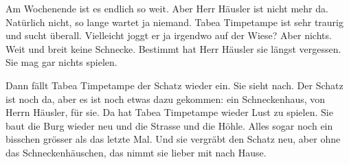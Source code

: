 Am Wochenende ist es endlich so weit. Aber Herr Häusler ist nicht mehr da. Natürlich nicht, so lange wartet ja niemand. Tabea Timpetampe ist sehr traurig und sucht überall. Vielleicht joggt er ja irgendwo auf der Wiese? Aber nichts. Weit und breit keine Schnecke. Bestimmt hat Herr Häusler sie längst vergessen. Sie mag gar nichts spielen.

Dann fällt Tabea Timpetampe der Schatz wieder ein. Sie sieht nach. Der Schatz ist noch da, aber es ist noch etwas dazu gekommen: ein Schneckenhaus, von Herrn Häusler, für sie. Da hat Tabea Timpetampe wieder Lust zu spielen. Sie baut die Burg wieder neu und die Strasse und die Höhle. Alles sogar noch ein bisschen grösser als das letzte Mal. Und sie vergräbt den Schatz neu, aber ohne das Schneckenhäuschen, das nimmt sie lieber mit nach Hause. \hfill {\color{DeepPink}\decofourleft}

